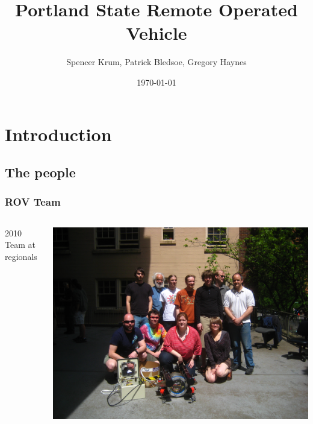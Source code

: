 \documentclass{beamer}
\title{Portland State Remote Operated Vehicle}
\date{\today}
\author{Spencer Krum, Patrick Bledsoe, Gregory Haynes}
\begin{document}
\frame{\titlepage}

\section{Introduction}
\subsection{The people}
\frame 
{
    \frametitle{ROV Team}
        \begin{columns}[c]
        \begin{center}
        2010 Team at regionals \\
        \end{center}
        \includegraphics[width=1\textwidth]{grouppic2010.jpg}
        

\end{columns}}
\end{document}
